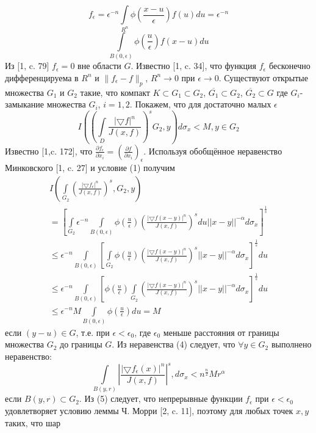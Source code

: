 $$
f_{\epsilon}=\epsilon^{-n}\int\limits_{R^n}\phi\left(\frac{x-u}{\epsilon}\right)f(u)du=\epsilon^{-n}$$
$$\int\limits_{B(0,\epsilon)}\phi\left(\frac{u}{\epsilon}\right)f(x-u)du
$$
Из [1, c. 79] $f_{\epsilon}=0$ вне области $G$. Известно [1, c. 34], что функция $f_{\epsilon}$ бесконечно дифференцируема в $R^n$ и $\|f_{\epsilon}-f\|_p$, $R^{n}\to 0$ при $\epsilon\to 0$. Существуют открытые множества $G_1$ и $G_2$ такие, что компакт $K\subset G_{1} \subset G_{2}$, $\overline{G_1}\subset G_{2}$, $\overline{G_2}\subset G$ где $G_i$- замыкание множества $G_i$, $i=1,2$.
 	Покажем, что для достаточно малых $\epsilon$
 	$$I\left(\left(
\int\limits_D\frac{|\bigtriangledown f|^{n}}{J(x,f)}
\right)^{s}G_{2},y\right) d\sigma_{x}<M, y\in G_2$$
Известно [1,c. 172], что $\frac{\partial f_\epsilon}{\partial x_i}=\left(\frac{\partial f}{\partial x_i}\right)_\epsilon$. Используя обобщённое неравенство Минковского [1, c. 27] и условие (1) получим
\begin{multline}
I\left(\int\limits_{G_2}\left(\frac{|\bigtriangledown f_{\epsilon}|^{n}}{J(x,f)}\right)^s, G_{2},y\right)\\
=\left[ \int\limits_{G_2}\epsilon^{-n}\int\limits_{B(0,\epsilon)}\phi\left(\frac{u}{\epsilon}\right)\left(\frac{|\bigtriangledown f(x-y)|^{n}}{J(x,f)}\right)^{s}
du||x-y||^{-\alpha}d\sigma_{x}\right]^{\frac{1}{s}}\\
\leq\epsilon^{-n}\int\limits_{B(0,\epsilon)}\left[\int\limits_{G_2}\phi\left(\frac{u}{\epsilon}\right)\left(\frac{|\bigtriangledown f(x-y)|^{n}}{J(x,f)}\right)^{s}||x-y||^{-\alpha}d\sigma_{x}\right]^{\frac{1}{s}}du
\\\leq\epsilon^{-n}\int\limits_{B(0,\epsilon)}\left[\phi\left(\frac{u}{\epsilon}\right)\int\limits_{G_2}\left(\frac{|\bigtriangledown f(x-y)|^{n}}{J(x,f)}\right)^{s}||x-y||^{-\alpha}d\sigma_{x}\right]^{\frac{1}{s}}du\\
\leq\epsilon^{-n}M\int\limits_{B(0,\epsilon)}\phi\left(\frac{u}{\epsilon}\right)du=M
\end{multline}
если $(y-u)\in G$, т.е. при $\epsilon<\epsilon_0$, где $\epsilon_0$ меньше расстояния от границы множества $G_2$ до границы $G$. Из неравенства (4) следует, что $\forall y\in G_2$ выполнено неравенство:
\begin{equation}
\int\limits_{B(y,r)}\left|\frac{|\bigtriangledown f_{\epsilon}(x)|^{n}}{J(x,f)}\right|^s, d\sigma_{x}<n^{\frac{n}{2}}Mr^\alpha
\end{equation}
если $B(y,r)\subset G_2$.
Из (5) следует, что непрерывные функции $f_{\epsilon}$ при $\epsilon<\epsilon_0$ удовлетворяет условию леммы Ч. Морри [2, c. 11], поэтому для любых точек $x, y$ таких, что шар
